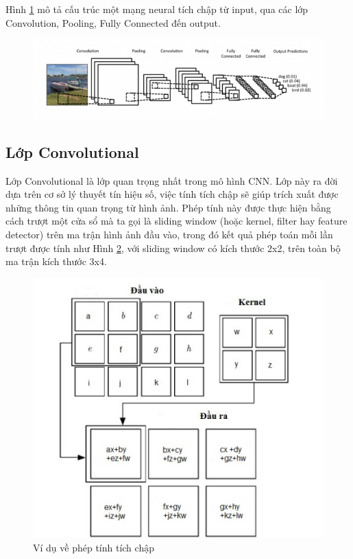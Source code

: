 Hình \ref{chap2:cnn_example} mô tả cấu trúc một mạng neural tích chập từ input, qua các lớp Convolution, Pooling, Fully Connected đến output.
\begin{center}
    \begin{figure}[H]
    \centering
    \includegraphics[width=1\columnwidth]{images/chap2/cnn.png}
    \label{chap2:cnn_example}
    \end{figure}
\end{center}

\subsection{Lớp Convolutional}
Lớp Convolutional là lớp quan trọng nhất trong mô hình CNN. Lớp này ra đời dựa trên cơ sở lý thuyết tín hiệu số, việc tính tích chập sẽ giúp trích xuất được những thông tin quan trọng từ hình ảnh. Phép tính này được thực hiện bằng cách trượt một cửa sổ mà ta gọi là sliding window (hoặc kernel, filter hay feature detector) trên ma trận hình ảnh đầu vào, trong đó kết quả phép toán mỗi lần trượt được tính như Hình \ref{chap2:calculation}, với sliding window có kích thước 2x2, trên toàn bộ ma trận kích thước 3x4.

\begin{center}
    \begin{figure}[H]
    \centering
    \includegraphics[width=0.6\columnwidth]{images/chap2/viduveconvulution.jpg}
    \caption{Ví dụ về phép tính tích chập}
    \label{chap2:calculation}
    \end{figure}
\end{center}

